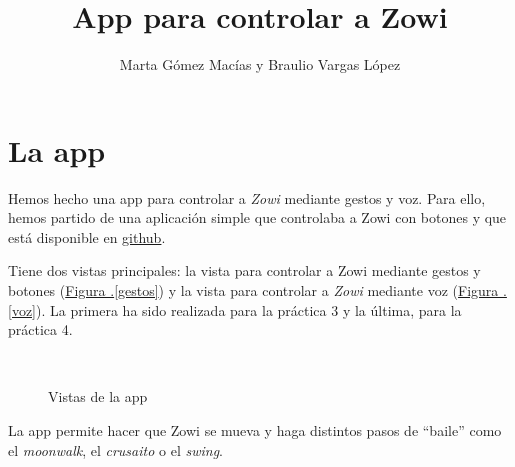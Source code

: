 \documentclass[10pt,a4paper,spanish]{article}
\title{\bf \textcolor{denim}{App para controlar a Zowi}}
\author{Marta Gómez Macías y Braulio Vargas López}
\begin{document}
\maketitle

\tableofcontents

\section{\textcolor{denim}La app}
Hemos hecho una app para controlar a \textit{\textcolor{denim}{Zowi}} mediante gestos y voz. Para ello, hemos partido de una aplicación simple que controlaba a Zowi con botones y que está disponible en \href{https://github.com/jalucenyo/ZowiApp3D}{github}.

Tiene dos vistas principales: la vista para controlar a Zowi mediante gestos y botones (\hyperref[gestos]{Figura \thesection .\ref*{gestos}}) y la vista para controlar a \textit{\textcolor{denim}{Zowi}} mediante voz (\hyperref[voz]{Figura \thesection .\ref*{voz}}). La primera ha sido realizada para la práctica 3 y la última, para la práctica 4.

\begin{figure}[!h]
    \centering
    \mbox{
    }
    \caption{Vistas de la app}
    \label{vistas}
\end{figure}

La app permite hacer que Zowi se mueva y haga distintos pasos de ``baile'' como el \textit{\textcolor{denim}{moonwalk}}, el \textit{\textcolor{denim}{crusaito}} o el \textit{\textcolor{denim}{swing}}.
\end{document}
